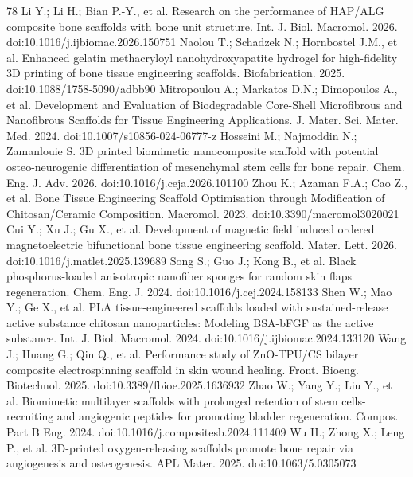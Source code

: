 \documentclass[5p,times,twocolumn]{elsarticle}
\begin{document}
\begin{thebibliography}{78}
\fontsize{7}{6.9}\selectfont
\setlength{\itemsep}{0pt}
\setlength{\parsep}{0pt}
\setlength{\parskip}{0pt}
 Li Y.; Li H.; Bian P.-Y., et al. Research on the performance of HAP/ALG composite bone scaffolds with bone unit structure. Int. J. Biol. Macromol. 2026. doi:10.1016/j.ijbiomac.2026.150751
 Naolou T.; Schadzek N.; Hornbostel J.M., et al. Enhanced gelatin methacryloyl nanohydroxyapatite hydrogel for high-fidelity 3D printing of bone tissue engineering scaffolds. Biofabrication. 2025. doi:10.1088/1758-5090/adbb90
 Mitropoulou A.; Markatos D.N.; Dimopoulos A., et al. Development and Evaluation of Biodegradable Core-Shell Microfibrous and Nanofibrous Scaffolds for Tissue Engineering Applications. J. Mater. Sci. Mater. Med. 2024. doi:10.1007/s10856-024-06777-z
 Hosseini M.; Najmoddin N.; Zamanlouie S. 3D printed biomimetic nanocomposite scaffold with potential osteo-neurogenic differentiation of mesenchymal stem cells for bone repair. Chem. Eng. J. Adv. 2026. doi:10.1016/j.ceja.2026.101100
 Zhou K.; Azaman F.A.; Cao Z., et al. Bone Tissue Engineering Scaffold Optimisation through Modification of Chitosan/Ceramic Composition. Macromol. 2023. doi:10.3390/macromol3020021
 Cui Y.; Xu J.; Gu X., et al. Development of magnetic field induced ordered magnetoelectric bifunctional bone tissue engineering scaffold. Mater. Lett. 2026. doi:10.1016/j.matlet.2025.139689
 Song S.; Guo J.; Kong B., et al. Black phosphorus-loaded anisotropic nanofiber sponges for random skin flaps regeneration. Chem. Eng. J. 2024. doi:10.1016/j.cej.2024.158133
 Shen W.; Mao Y.; Ge X., et al. PLA tissue-engineered scaffolds loaded with sustained-release active substance chitosan nanoparticles: Modeling BSA-bFGF as the active substance. Int. J. Biol. Macromol. 2024. doi:10.1016/j.ijbiomac.2024.133120
 Wang J.; Huang G.; Qin Q., et al. Performance study of ZnO-TPU/CS bilayer composite electrospinning scaffold in skin wound healing. Front. Bioeng. Biotechnol. 2025. doi:10.3389/fbioe.2025.1636932
 Zhao W.; Yang Y.; Liu Y., et al. Biomimetic multilayer scaffolds with prolonged retention of stem cells-recruiting and angiogenic peptides for promoting bladder regeneration. Compos. Part B Eng. 2024. doi:10.1016/j.compositesb.2024.111409
 Wu H.; Zhong X.; Leng P., et al. 3D-printed oxygen-releasing scaffolds promote bone repair via angiogenesis and osteogenesis. APL Mater. 2025. doi:10.1063/5.0305073

\end{thebibliography}
\end{document}
